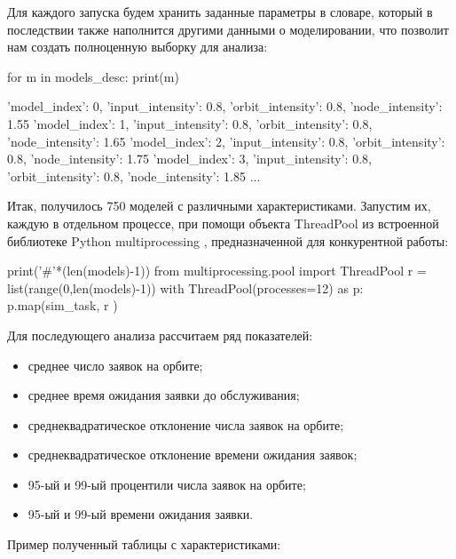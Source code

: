 Для каждого запуска будем хранить заданные параметры в словаре, который в последствии также наполнится другими данными о моделировании, что позволит нам создать полноценную выборку для анализа:

\begin{pyin}
for m in models_desc:
   print(m)
\end{pyin}

\begin{pyprint}
{'model_index': 0, 'input_intensity': 0.8, 'orbit_intensity': 0.8, 'node_intensity': 1.55}
{'model_index': 1, 'input_intensity': 0.8, 'orbit_intensity': 0.8, 'node_intensity': 1.65}
{'model_index': 2, 'input_intensity': 0.8, 'orbit_intensity': 0.8, 'node_intensity': 1.75}
{'model_index': 3, 'input_intensity': 0.8, 'orbit_intensity': 0.8, 'node_intensity': 1.85}
...
\end{pyprint}

Итак, получилось 750 моделей с различными характеристиками. Запустим их, каждую в отдельном процессе, при помощи объекта ThreadPool из встроенной библиотеке Python multiprocessing \cite{multiproc}, предназначенной для конкурентной работы:
\begin{pyin}
print('#'*(len(models)-1))
from multiprocessing.pool import ThreadPool
r = list(range(0,len(models)-1))
with  ThreadPool(processes=12) as p:
   p.map(sim_task, r )
\end{pyin}

Для последующего анализа рассчитаем ряд показателей:
\begin{itemize}
	\item среднее число заявок на орбите;
	\item среднее время ожидания заявки до обслуживания;
	\item среднеквадратическое отклонение числа заявок на орбите;
	\item среднеквадратическое отклонение времени ожидания заявок;
	\item 95-ый и 99-ый процентили числа заявок на орбите;
	\item 95-ый и 99-ый времени ожидания заявки.
\end{itemize}

Пример полученный таблицы с характеристиками:

